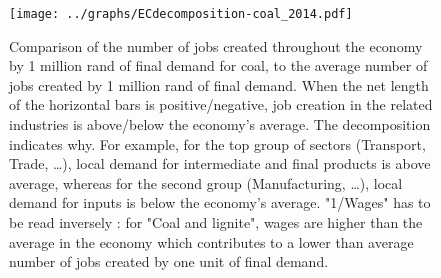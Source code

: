 \documentclass[12pt,english]{article}
\begin{document}

\begin{figure}[!t]
	\centering
	\hspace{-16pt}\texttt{[image: ../graphs/ECdecomposition-coal\_2014.pdf]}
	\caption{\label{ECdecomposition-coal_2014}\small Comparison of the number of jobs created throughout the economy by 1 million rand of final demand for coal, to the average number of jobs created by 1 million rand of final demand. When the net length of the horizontal bars is positive/negative, job creation in the related industries is above/below the economy's average. The decomposition indicates why. For example, for the top group of sectors (Transport, Trade, \ldots), local demand for intermediate and final products is above average, whereas for the second group (Manufacturing, \ldots), local demand for inputs is below the economy's average. "1/Wages" has to be read inversely : for "Coal and lignite", wages are higher than the average in the economy which contributes to a lower than average number of jobs created by one unit of final demand. }
\end{figure}
\end{document}
